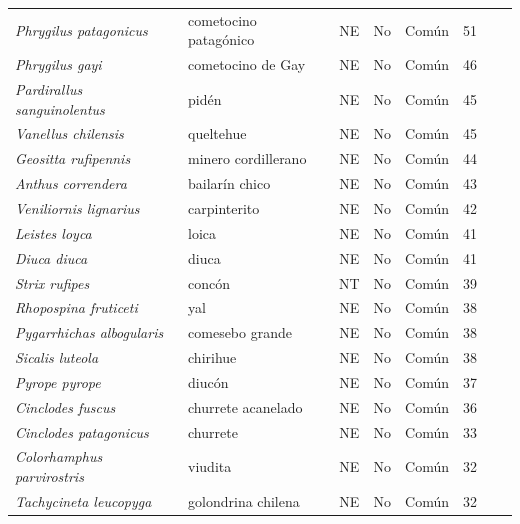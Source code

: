 {\begin{longtable}{@{}l l c c l r r r@{}}
    \textit{Phrygilus patagonicus} & cometocino patagónico & NE & No & Común & 51 &  &  \\
    \textit{Phrygilus gayi} & cometocino de Gay & NE & No & Común & 46 &  &  \\
    \textit{Pardirallus sanguinolentus} & pidén & NE & No & Común & 45 &  &  \\
    \textit{Vanellus chilensis} & queltehue & NE & No & Común & 45 &  &  \\
    \textit{Geositta rufipennis} & minero cordillerano & NE & No & Común & 44 &  &  \\
    \textit{Anthus correndera} & bailarín chico & NE & No & Común & 43 &  &  \\
    \textit{Veniliornis lignarius} & carpinterito & NE & No & Común & 42 &  &  \\
    \textit{Leistes loyca} & loica & NE & No & Común & 41 &  &  \\
    \textit{Diuca diuca} & diuca & NE & No & Común & 41 &  &  \\
    \textit{Strix rufipes} & concón & NT & No & Común & 39 &  &  \\
    \textit{Rhopospina fruticeti} & yal & NE & No & Común & 38 &  &  \\
    \textit{Pygarrhichas albogularis} & comesebo grande & NE & No & Común & 38 &  &  \\
    \textit{Sicalis luteola} & chirihue & NE & No & Común & 38 &  &  \\
    \textit{Pyrope pyrope} & diucón & NE & No & Común & 37 &  &  \\
    \textit{Cinclodes fuscus} & churrete acanelado & NE & No & Común & 36 &  &  \\
    \textit{Cinclodes patagonicus} & churrete & NE & No & Común & 33 &  &  \\
    \textit{Colorhamphus parvirostris} & viudita & NE & No & Común & 32 &  &  \\
    \textit{Tachycineta leucopyga} & golondrina chilena & NE & No & Común & 32 &  &  \\
\end{longtable}}
